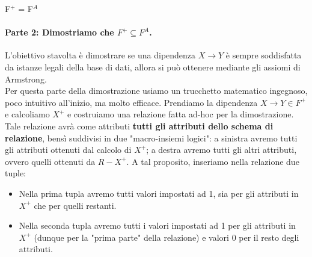 \documentclass[12pt]{report}
\newcommand{\ra}{
	\rightarrow
}
\begin{document}
\begin{dimostrazione}{F$^+$ = F$^A$}{}
		\paragraph{Parte 2: Dimostriamo che $F^+ \subseteq F^A$.} L'obiettivo stavolta è dimostrare se una dipendenza $X \ra Y$ è sempre soddisfatta da istanze legali della base di dati, allora si può ottenere mediante gli assiomi di Armstrong.\\
		Per questa parte della dimostrazione usiamo un trucchetto matematico ingegnoso, poco intuitivo all'inizio, ma molto efficace. Prendiamo la dipendenza $X \ra Y \in F^+$ e calcoliamo $X^+$ e costruiamo una relazione fatta ad-hoc per la dimostrazione. Tale relazione avrà come attributi \textbf{tutti gli attributi dello schema di relazione}, bensì suddivisi in due "macro-insiemi logici": a sinistra avremo tutti gli attributi ottenuti dal calcolo di $X^+$; a destra avremo tutti gli altri attributi, ovvero quelli ottenuti da $R - X^+$. A tal proposito, inseriamo nella relazione due tuple:
		\begin{itemize}
			\item Nella prima tupla avremo tutti valori impostati ad 1, sia per gli attributi in $X^+$ che per quelli restanti.
			
			\item Nella seconda tupla avremo tutti i valori impostati ad 1 per gli attributi in $X^+$ (dunque per la "prima parte" della relazione) e valori 0 per il resto degli attributi.
		\end{itemize}
		\begin{center}
\end{center}
\end{dimostrazione}
\end{document}
